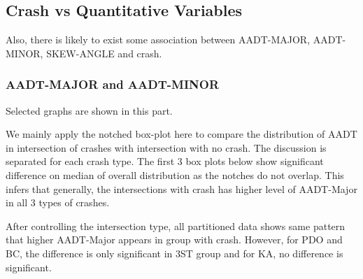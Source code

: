 \documentclass[11pt]{scrartcl} %
\begin{document}
\subsection{Crash vs Quantitative Variables}

Also, there is likely to exist some association between AADT-MAJOR, AADT-MINOR, SKEW-ANGLE and crash.

\subsubsection{AADT-MAJOR and AADT-MINOR}

Selected graphs are shown in this part.

We mainly apply the notched box-plot here to compare the distribution of AADT in intersection of crashes with intersection with no crash. The discussion is separated for each crash type. The first 3 box plots below show significant difference on median of overall distribution as the notches do not overlap. This infers that generally, the intersections with crash has higher level of AADT-Major in all 3 types of crashes.

After controlling the intersection type, all partitioned data shows same pattern that higher AADT-Major appears in group with crash. However, for PDO and BC, the difference is only significant in 3ST group and for KA, no difference is significant.
\end{document}
